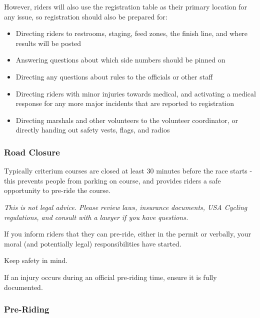 \documentclass[
  letterpaper, %
  fontsize=10pt, %
  twoside=true,
  chapterentrydots=true, %
  numbers=noenddot,
  fontmethod=tex,
]{kaobook}
\begin{document}

However, riders will also use the registration table as their primary location
for any issue, so registration should also be prepared for:

\begin{itemize}
  \item Directing riders to restrooms, staging, feed zones, the finish line, and where results will be posted
  \item Answering questions about which side numbers should be pinned on
  \item Directing any questions about rules to the officials or other staff
  \item Directing riders with minor injuries towards medical, and activating a medical response for any more major incidents that are reported to registration
  \item Directing marshals and other volunteers to the volunteer coordinator, or directly handing out safety vests, flags, and radios
\end{itemize}

\subsubsection{Road Closure}

Typically criterium courses are closed at least 30 minutes before the race starts - this prevents people from parking on course, and provides riders a safe opportunity to pre-ride the course.

\begin{kaobox}[title=Official Pre-Riding and Legal Liabilities]
\textit{This is not legal advice. Please review laws, insurance documents, USA Cycling regulations, and consult with a lawyer if you have questions.}

If you inform riders that they can pre-ride, either in the permit or verbally, your moral (and potentially legal) responsibilities have started.

Keep safety in mind.

If an injury occurs during an official pre-riding time,
ensure it is fully documented. %
\end{kaobox}

\subsubsection{Pre-Riding}
\end{document}

